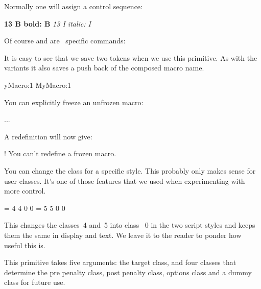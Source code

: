 Normally one will assign a control sequence:

\startbuffer
{ \bf {} 13 {B   bold}: \meaning B}\crlf
{ \it {} 13 {I italic}: \meaning I}\par
\stopbuffer

\typebuffer

Of course \type {\bf} and \type {\it} are \CONTEXT\ specific commands:

{\tttf \getbuffer}

\stopnewprimitive

\startnewprimitive[title={\prm {letcsname}}]

It is easy to see that we save two tokens when we use this primitive. As with the
 variants it also saves a push back of the composed macro name.

\starttyping
\expandafter\let\csname MyMacro:1\endcsname\relax
              MyMacro:1\endcsname\relax
\stoptyping

\stopnewprimitive

\startnewprimitive[title={\prm {letfrozen}}]

You can explicitly freeze an unfrozen macro:

\starttyping
\def\MyMacro{...}
\MyMacro
\stoptyping

A redefinition will now give:

\starttyping
! You can't redefine a frozen macro.
\stoptyping

\stopnewprimitive

\startnewprimitive[title={\prm {letmathatomrule}}]

You can change the class for a specific style. This probably only makes sense
for user classes. It's one of those features that we used when experimenting
with more control.

\starttyping
{} = 4 4 0 0
 = 5 5 0 0
\stoptyping

This changes the classes~4 and~5 into class~ 0 in the two script styles and keeps
them the same in display and text. We leave it to the reader to ponder how useful
this is.

\stopnewprimitive

\startnewprimitive[title={\prm {letmathparent}}]

This primitive takes five arguments: the target class, and four classes that
determine the pre penalty class, post penalty class, options class and a dummy
class for future use.

